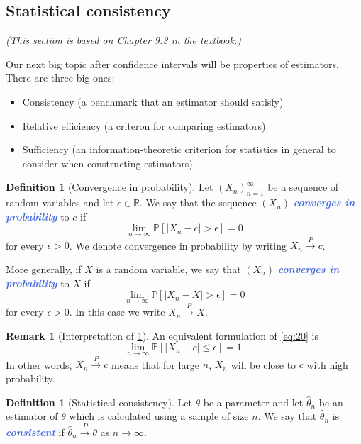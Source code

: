 \documentclass[10pt]{article}
\theoremstyle{definition}
\newtheorem{definition}[theorem]{Definition}
\newtheorem{remark}[theorem]{Remark}
\newcommand{\plim}{\overset{P}{\to}} %
\newcommand{\1}[1]{\textbf{1}_{\left[#1\right]}} %
\def\R{\mathbb{R}} %
\def\P{\mathbb{P}} %
\newcommand{\demph}[1]{\textcolor{RoyalBlue}{\textbf{\slshape #1}}} %
\begin{document}
\subsection{Statistical consistency}
\textit{(This section is based on Chapter 9.3 in the textbook.)}

Our next big topic after confidence intervals will be properties of
estimators. There are three big ones:
\begin{itemize}
  \item Consistency (a benchmark that an estimator should satisfy)
  \item Relative efficiency (a criteron for comparing estimators)
  \item Sufficiency (an information-theoretic criterion for statistics in
  general to consider when constructing estimators)
\end{itemize}

\begin{definition}[Convergence in probability]
  \label{def:convergence-probability}
  Let $(X_{n})_{n=1}^{\infty}$ be a sequence of random variables and let $c\in \R$. We say that the
  sequence $(X_{n})$ \demph{converges in probability} to $c$ if
  \begin{equation}\label{eq:20}
    \lim_{n\to\infty}\P\left[\left| X_{n}-c \right| >\epsilon\right] = 0
  \end{equation}
  for every $\epsilon>0$. We denote convergence in probability by writing
  $X_{n}\plim c$.

  More generally, if $X$ is a random variable, we say that $(X_{n})$ \demph{converges in
  probability} to $X$ if
  \begin{equation*}
    \lim_{n\to\infty} \P\left[\left| X_{n}-X \right|>\epsilon \right] =0
  \end{equation*}
  for every $\epsilon>0$. In this case we write $X_{n}\plim X$.
\end{definition}

\begin{remark}[Interpretation of \cref{def:convergence-probability}]
  An equivalent formulation of \cref{eq:20} is
  \begin{equation*}
    \lim_{n\to\infty} \P\left[\left| X_{n}-c \right| \leq \epsilon\right] =1.
  \end{equation*}
  In other words, $X_{n}\plim c$ means that for large $n$, $X_{n}$ will be close to $c$ with high
  probability.
\end{remark}

\begin{definition}[Statistical consistency]
  \label{def:statistical-consistency}
  Let $\theta$ be a parameter and let $\widehat{\theta}_{n}$ be an estimator
  of $\theta$ which is calculated using a sample of size $n$. We say that
  $\widehat{\theta}_{n}$ is \demph{consistent} if
  $\widehat{\theta}_{n} \plim \theta$ as $n \to \infty$.
\end{definition}
\end{document}
